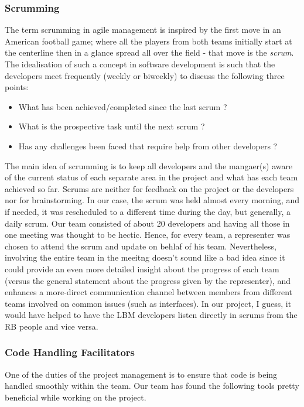 \subsubsection{Scrumming}
The term scrumming in agile management is inspired by the first move in an American football game; where all the players from both teams initially start at the centerline then in a glance spread all over the field - that move is the \emph{scrum}. The idealisation of such a concept in software development is such that the developers meet frequently (weekly or biweekly) to discuss the following three points:
\begin{itemize}
  \item{What has been achieved/completed since the last scrum ?}
  \item{What is the prospective task until the next scrum ?}
  \item{Has any challenges been faced that require help from other developers ?}
\end{itemize}
The main idea of scrumming is to keep all developers and the mangaer(s) aware of the current status of each separate area in the project and what has each team achieved so far. Scrums are neither for feedback on the project or the developers nor for brainstorming. In our case, the scrum was held almost every morning, and if needed, it was rescheduled to a different time during the day, but generally, a daily scrum.
Our team consisted of about 20 developers and having all those in one meeting was thought to be hectic. Hence, for every team, a representer was chosen to attend the scrum and update on behlaf of his team. Nevertheless, involving the entire team in the meeitng doesn't sound like a bad idea since it could provide an even more detailed insight about the progress of each team (versus the general statement about the progress given by the representer), and enhances a more-direct communication channel between members from different teams involved on common issues (such as interfaces). In our project, I guess, it would have helped to have the LBM developers listen directly in scrums from the RB people and vice versa.


\subsubsection{Code Handling Facilitators}
One of the duties of the project management is to ensure that code is being handled smoothly within the team. Our team has found the following tools pretty beneficial while working on the project.

